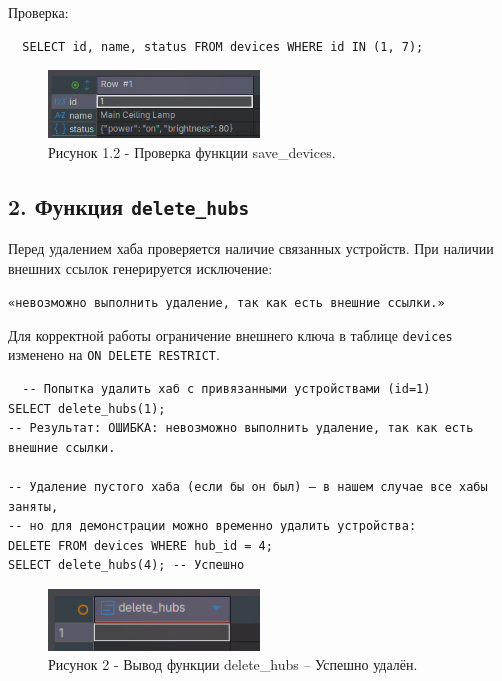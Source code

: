 \documentclass[oneside,a4paper,14pt]{extarticle}
\begin{document}
Проверка:\\
\begin{verbatim}
  SELECT id, name, status FROM devices WHERE id IN (1, 7);
\end{verbatim}

\begin{figure}[H]
  \centering
  \includegraphics[width=0.5\textwidth]{pics/check.png}
  \caption*{Рисунок 1.2 - Проверка функции save\_devices.}
\end{figure}

\subsection*{2. Функция \texttt{delete\_hubs}}

Перед удалением хаба проверяется наличие связанных устройств. При наличии внешних ссылок генерируется исключение:
\begin{center}
  \texttt{«невозможно выполнить удаление, так как есть внешние ссылки.»}
\end{center}

Для корректной работы ограничение внешнего ключа в таблице \texttt{devices} изменено на \texttt{ON DELETE RESTRICT}.

\begin{verbatim}
  -- Попытка удалить хаб с привязанными устройствами (id=1)
SELECT delete_hubs(1);
-- Результат: ОШИБКА: невозможно выполнить удаление, так как есть внешние ссылки.

-- Удаление пустого хаба (если бы он был) — в нашем случае все хабы заняты,
-- но для демонстрации можно временно удалить устройства:
DELETE FROM devices WHERE hub_id = 4;
SELECT delete_hubs(4); -- Успешно
\end{verbatim}

\begin{figure}[H]
  \centering
  \includegraphics[width=0.5\textwidth]{pics/delete_hubs.png}
  \caption*{Рисунок 2 - Вывод функции delete\_hubs -- Успешно удалён.}
\end{figure}
\end{document}
